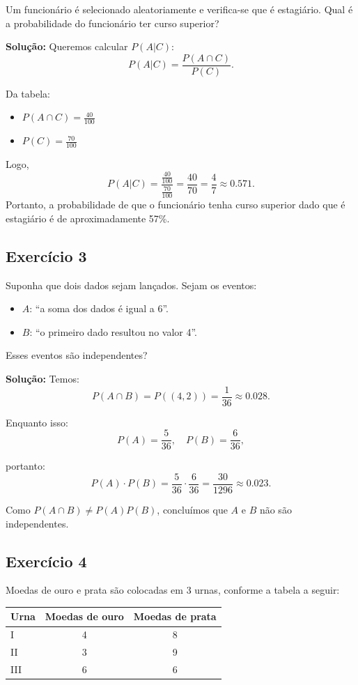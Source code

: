 \documentclass{article}
\begin{document}
Um funcionário é selecionado aleatoriamente e verifica-se que é estagiário. Qual é a probabilidade do funcionário ter curso superior?

\vspace{0.5cm}
\textbf{Solução:}
Queremos calcular $P(A|C)$:
    $$
    P(A|C) = \frac{P(A \cap C)}{P(C)}.
    $$
    
Da tabela:  
\begin{itemize} 
    \item $P(A \cap C) = \tfrac{40}{100}$  
    \item $P(C) = \tfrac{70}{100}$  
\end{itemize}

Logo,
    $$
    P(A|C) = \frac{\tfrac{40}{100}}{\tfrac{70}{100}} = \frac{40}{70} = \frac{4}{7} \approx 0.571.
    $$
Portanto, a probabilidade de que o funcionário tenha curso superior dado que é estagiário é de aproximadamente 57\%.

\subsection{Exercício 3}
Suponha que dois dados sejam lançados. Sejam os eventos:
\begin{itemize}
    \item $A$: ``a soma dos dados é igual a 6''.  
    \item $B$: ``o primeiro dado resultou no valor 4''.  
\end{itemize}

Esses eventos são independentes?

\vspace{0.5cm}
\textbf{Solução:}
Temos:
    $$
    P(A \cap B) = P((4,2)) = \frac{1}{36} \approx 0.028.
    $$

Enquanto isso:
    $$
    P(A) = \frac{5}{36}, \quad P(B) = \frac{6}{36}, 
    $$

portanto:
    $$
    P(A) \cdot P(B) = \frac{5}{36} \cdot \frac{6}{36} = \frac{30}{1296} \approx 0.023.
    $$

Como $P(A \cap B) \neq P(A)P(B)$, concluímos que $A$ e $B$ não são independentes.

\subsection{Exercício 4}
Moedas de ouro e prata são colocadas em 3 urnas, conforme a tabela a seguir:
\vspace{0.5cm}
    \begin{center}
    \begin{tabular}{lcc}
    \hline
    Urna & Moedas de ouro & Moedas de prata \\
    \hline
    I    & 4 & 8 \\
    II   & 3 & 9 \\
    III  & 6 & 6 \\
    \hline
    \end{tabular}
    \end{center}
\end{document}
